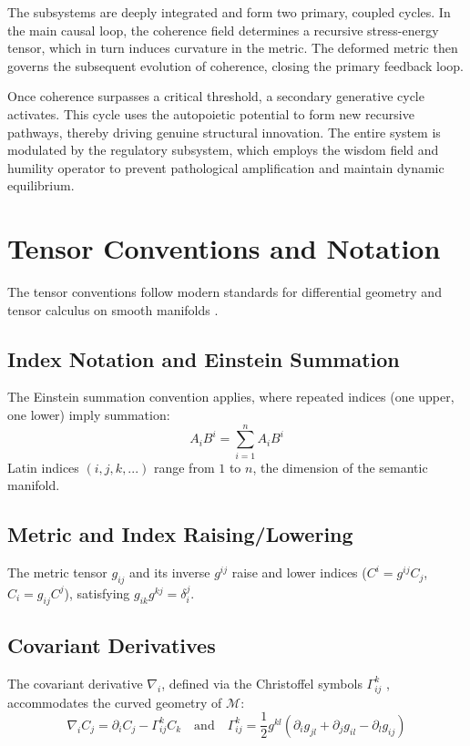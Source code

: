 The subsystems are deeply integrated and form two primary, coupled cycles. In the main causal loop, the coherence field determines a recursive stress-energy tensor, which in turn induces curvature in the metric. The deformed metric then governs the subsequent evolution of coherence, closing the primary feedback loop. 

Once coherence surpasses a critical threshold, a secondary generative cycle activates. This cycle uses the autopoietic potential to form new recursive pathways, thereby driving genuine structural innovation. The entire system is modulated by the regulatory subsystem, which employs the wisdom field and humility operator to prevent pathological amplification and maintain dynamic equilibrium.

\section{Tensor Conventions and Notation}

The tensor conventions follow modern standards for differential geometry and tensor calculus on smooth manifolds \autocite{Lee2003, MisnerThorneWheeler1973}.

\subsection{Index Notation and Einstein Summation}

The Einstein summation convention \autocite{Einstein1916} applies, where repeated indices (one upper, one lower) imply summation:
\begin{equation}
A_i B^i = \sum_{i=1}^n A_i B^i
\end{equation}
Latin indices \((i,j,k,...)\) range from \(1\) to \(n\), the dimension of the semantic manifold.

\subsection{Metric and Index Raising/Lowering}

The metric tensor \(g_{ij}\) and its inverse \(g^{ij}\) raise and lower indices (\(C^i = g^{ij} C_j\), \(C_i = g_{ij} C^j\)), satisfying \(g_{ik} g^{kj} = \delta_i^j\).

\subsection{Covariant Derivatives}

The covariant derivative \(\nabla_i\), defined via the Christoffel symbols \(\Gamma^k_{ij}\) \autocite{Christoffel1869}, accommodates the curved geometry of \(\mathcal{M}\):
\begin{equation}
\nabla_i C_j = \partial_i C_j - \Gamma^k_{ij} C_k \quad \text{and} \quad \Gamma^k_{ij} = \frac{1}{2} g^{kl} ( \partial_i g_{jl} + \partial_j g_{il} - \partial_l g_{ij} )
\end{equation}

